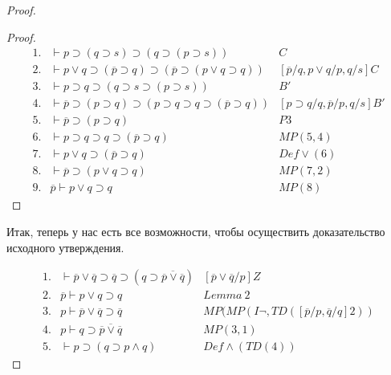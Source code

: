 \begin{proof}
\begin{proof}
        \begin{equation*}
            \begin{array}{llr}
                1. & \vdash p \supset (q \supset s) \supset (q \supset (p \supset s)) & C \\
                2. & \vdash p\lor q \supset (\overline{p} \supset q) \supset (\overline{p} \supset (p \lor q \supset q)) & [\overline{p}/q, p\lor q/p, q/s]C \\
                3. & \vdash p \supset q \supset (q \supset s \supset (p \supset s)) & B' \\
                4. & \vdash \overline{p} \supset (p \supset q) \supset (p \supset q \supset q \supset (\overline{p} \supset q)) & [p \supset q/q, \overline{p}/p, q/s]B'\\
                5. & \vdash \overline{p} \supset (p \supset q) & P3 \\
                6. & \vdash p \supset q \supset q \supset (\overline{p} \supset q) & MP(5,4) \\
                7. & \vdash p \lor q \supset (\overline{p} \supset q) & Def\lor(6) \\
                8. & \vdash \overline{p} \supset (p \lor q \supset q) & MP(7,2) \\
                9. & \overline{p} \vdash p \lor q \supset q & MP(8)
            \end{array}
        \end{equation*}
    \end{proof}

    Итак, теперь у нас есть все возможности, чтобы осуществить доказательство исходного утверждения.

    \begin{equation*}
        \begin{array}{llr}
            1. & \vdash \overline{p} \lor \overline{q} \supset \overline{q} \supset (q \supset \overline{\overline{p} \lor \overline{q}}) & [\overline{p} \lor \overline{q}/p]Z \\
            2. & \overline{p} \vdash p \lor q \supset q & Lemma\ 2\\
            3. & p \vdash \overline{p} \lor \overline{q} \supset \overline{q} & MP(MP(I\lnot, TD([\overline{p}/p, \overline{q}/q]2)) \\
            4. & p \vdash q \supset \overline{\overline{p} \lor \overline{q}} & MP(3,1) \\
            5. & \vdash p \supset (q \supset p \land q) & Def \land(TD(4))
        \end{array}
    \end{equation*}
\end{proof}

